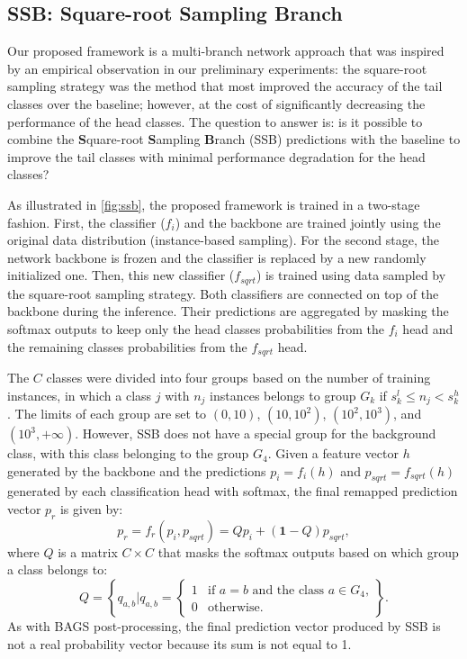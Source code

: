 \subsection{SSB: Square-root Sampling Branch}

Our proposed framework is a multi-branch network approach that was inspired by
an empirical observation in our preliminary experiments: the square-root
sampling strategy was the method that most improved the accuracy of the tail
classes over the baseline; however, at the cost of significantly decreasing the
performance of the head classes. The question to answer is: is it possible to
combine the \textbf{S}quare-root \textbf{S}ampling \textbf{B}ranch (SSB)
predictions with the baseline to improve the tail classes with minimal
performance degradation for the head classes?

As illustrated in \autoref{fig:ssb}, the proposed framework is trained in a
two-stage fashion. First, the classifier ($f_i$) and the backbone are trained
jointly using the original data distribution (instance-based sampling). For the
second stage, the network backbone is frozen and the classifier is replaced by
a new randomly initialized one. Then, this new classifier ($f_{sqrt}$) is
trained using data sampled by the square-root sampling strategy. Both
classifiers are connected on top of the backbone during the inference. Their
predictions are aggregated by masking the softmax outputs to keep only the head
classes probabilities from the $f_i$ head and the remaining classes
probabilities from the $f_{sqrt}$ head.

The $C$ classes were divided into four groups based on the number of training
instances, in which a class $j$ with $n_j$ instances belongs to group $G_k$ if
$s_k^l \leq n_j < s_k^h$. The limits of each group are set to $(0, 10)$, $(10,
10^2)$, $(10^2, 10^3)$, and $(10^3, +\infty)$. However, SSB does not have a
special group for the background class, with this class belonging to the group
$G_4$. Given a feature vector $h$ generated by the backbone and the predictions
$p_i = f_i(h)$ and $p_{sqrt} = f_{sqrt}(h)$ generated by each classification
head with softmax, the final remapped prediction vector $p_r$ is given by:
\begin{equation}\label{eq:ssb}
 p_r = f_r(p_i, p_{sqrt}) = Qp_i + (\bm{1} - Q)p_{sqrt},
\end{equation}
where $Q$ is a matrix $C\times C$ that masks the softmax outputs based on which
group a class belongs to:
\begin{equation}\label{eq:ssb_mask}
 Q = \left\{ q_{a,b} | q_{a, b} = \begin{cases}
      1 & \text{if } a=b \text{ and the class } a \in G_4 \text{,}\\
      0 & \text{otherwise.}
    \end{cases}\right\}.
\end{equation}
As with BAGS post-processing, the final prediction vector produced by SSB is
not
a real probability vector because its sum is not equal to 1.

